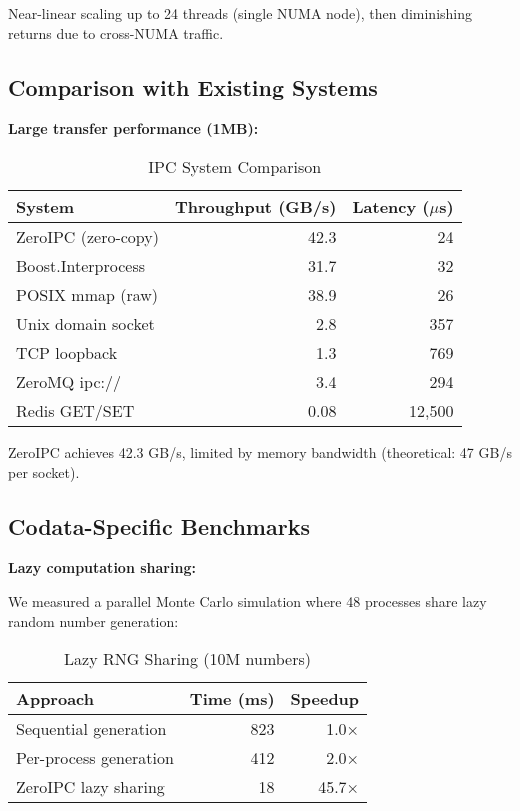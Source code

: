 \documentclass[letterpaper,twocolumn,10pt]{article}
\newcommand{\projectname}{ZeroIPC}
\begin{document}
Near-linear scaling up to 24 threads (single NUMA node), then diminishing returns due to cross-NUMA traffic.

\subsection{Comparison with Existing Systems}

\textbf{Large transfer performance (1MB):}

\begin{table}[h]
\centering
\caption{IPC System Comparison}
\label{tab:comparison}
\begin{tabular}{lrr}
\toprule
System & Throughput (GB/s) & Latency ($\mu$s) \\
\midrule
\projectname{} (zero-copy) & 42.3 & 24 \\
Boost.Interprocess & 31.7 & 32 \\
POSIX mmap (raw) & 38.9 & 26 \\
Unix domain socket & 2.8 & 357 \\
TCP loopback & 1.3 & 769 \\
ZeroMQ ipc:// & 3.4 & 294 \\
Redis GET/SET & 0.08 & 12,500 \\
\bottomrule
\end{tabular}
\end{table}

\projectname{} achieves 42.3 GB/s, limited by memory bandwidth (theoretical: 47 GB/s per socket).

\subsection{Codata-Specific Benchmarks}

\textbf{Lazy computation sharing:}

We measured a parallel Monte Carlo simulation where 48 processes share lazy random number generation:

\begin{table}[h]
\centering
\caption{Lazy RNG Sharing (10M numbers)}
\label{tab:lazy}
\begin{tabular}{lrr}
\toprule
Approach & Time (ms) & Speedup \\
\midrule
Sequential generation & 823 & 1.0× \\
Per-process generation & 412 & 2.0× \\
\projectname{} lazy sharing & 18 & 45.7× \\
\bottomrule
\end{tabular}
\end{table}
\end{document}
